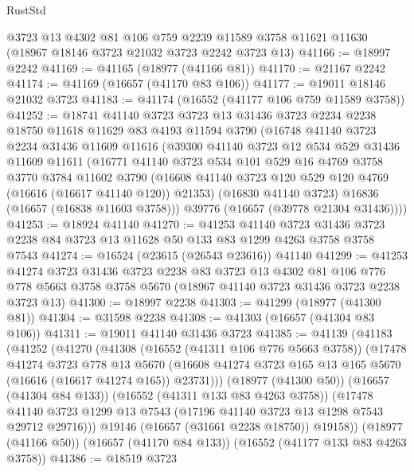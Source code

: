 \begin{lexlean}{RustStd}
\begin{coremodule}
    @3723
    @13
    @4302
    @81
    @106
    @759
    @2239
    @11589
    @3758
    @11621
    @11630
    (@18967 @18146 @3723 @21032 @3723 @2242 @3723 @13)
@41166 := @18997 @2242
@41169 := @41165 (@18977 (@41166 @81))
@41170 := @21167 @2242
@41174 := @41169 (@16657 (@41170 @83 @106))
@41177 := @19011 @18146 @21032 @3723
@41183 := @41174 (@16552 (@41177 @106 @759 @11589 @3758))
@41252 := @18741
    @41140
    @3723
    @3723
    @13
    @31436
    @3723
    @2234
    @2238
    @18750
    @11618
    @11629
    @83
    @4193
    @11594
    @3790
    (@16748
      @41140
      @3723
      @2234
      @31436
      @11609
      @11616
      (@39300
        @41140
        @3723
        @12
        @534
        @529
        @31436
        @11609
        @11611
        (@16771
          @41140
          @3723
          @534
          @101
          @529
          @16
          @4769
          @3758
          @3770
          @3784
          @11602
          @3790
          (@16608 @41140 @3723 @120 @529 @120 @4769 (@16616 (@16617 @41140 @120)) @21353)
          (@16830 @41140 @3723)
          @16836
          (@16657 (@16838 @11603 @3758)))
        @39776
        (@16657 (@39778 @21304 @31436))))
@41253 := @18924 @41140
@41270 := @41253
    @41140
    @3723
    @31436
    @3723
    @2238
    @84
    @3723
    @13
    @11628
    @50
    @133
    @83
    @1299
    @4263
    @3758
    @3758
    @7543
@41274 := @16524 (@23615 (@26543 @23616)) @41140
@41299 := @41253
    @41274
    @3723
    @31436
    @3723
    @2238
    @83
    @3723
    @13
    @4302
    @81
    @106
    @776
    @778
    @5663
    @3758
    @3758
    @5670
    (@18967 @41140 @3723 @31436 @3723 @2238 @3723 @13)
@41300 := @18997 @2238
@41303 := @41299 (@18977 (@41300 @81))
@41304 := @31598 @2238
@41308 := @41303 (@16657 (@41304 @83 @106))
@41311 := @19011 @41140 @31436 @3723
@41385 := @41139
    (@41183
      (@41252
        (@41270
          (@41308
            (@16552 (@41311 @106 @776 @5663 @3758))
            (@17478
              @41274
              @3723
              @778
              @13
              @5670
              (@16608 @41274 @3723 @165 @13 @165 @5670 (@16616 (@16617 @41274 @165)) @23731)))
          (@18977 (@41300 @50))
          (@16657 (@41304 @84 @133))
          (@16552 (@41311 @133 @83 @4263 @3758))
          (@17478 @41140 @3723 @1299 @13 @7543 (@17196 @41140 @3723 @13 @1298 @7543 @29712 @29716)))
        @19146
        (@16657 (@31661 @2238 @18750))
        @19158))
    (@18977 (@41166 @50))
    (@16657 (@41170 @84 @133))
    (@16552 (@41177 @133 @83 @4263 @3758))
@41386 := @18519 @3723

\end{coremodule}
\end{lexlean}
